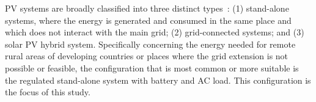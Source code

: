\documentclass[journal]{IEEEtran}
\begin{document}
PV systems are broadly classified into three distinct types~\cite{Mohanty}: (1) stand-alone systems, where the energy is generated and consumed in the same place and which does not interact with the main grid; (2) grid-connected systems; and (3) solar PV hybrid system. %
%
Specifically concerning the energy needed for remote rural areas of developing countries or places where the grid extension is not possible or feasible, 
the configuration that is most common or more suitable is the regulated stand-alone system with battery and AC load. This configuration is the focus of this study.
\end{document}
